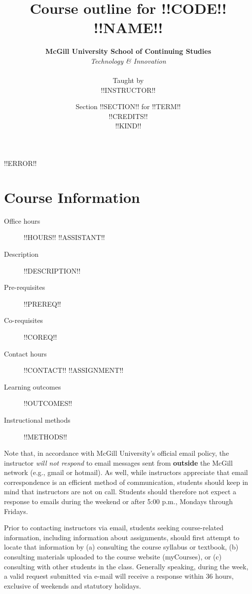 \documentclass{article}
\title{Course outline for !!CODE!! \\ {\sc !!NAME!!}}
\date{Section !!SECTION!! for !!TERM!! \\ !!CREDITS!! \\ !!KIND!!}
\author{{\bf McGill University School of Continuing Studies} \\
  {\em Technology \& Innovation} \\
  \\ Taught by \\ !!INSTRUCTOR!! }
\begin{document}
\maketitle

\thispagestyle{fancy}

!!ERROR!!

\newpage

\tableofcontents
{}

\newpage

\section{Course Information}

\begin{description}
\item[Office hours]{ !!HOURS!!}
!!ASSISTANT!!
\item[Description]{ !!DESCRIPTION!! }
\item[Pre-requisites]{!!PREREQ!!}
\item[Co-requisites]{!!COREQ!!}
\item[Contact hours]{!!CONTACT!!}
!!ASSIGNMENT!!
\item[Learning outcomes]{ !!OUTCOMES!! }
\item[Instructional methods]{ !!METHODS!! }

\end{description}

Note that, in accordance with McGill University’s official email
policy, the instructor {\em will not respond} to email messages sent
from {\bf outside} the McGill network (e.g., gmail or hotmail). As
well, while instructors appreciate that email correspondence is an
efficient method of communication, students should keep in mind that
instructors are not on call. Students should therefore not expect a
response to emails during the weekend or after 5:00 p.m., Mondays
through Fridays.

Prior to contacting instructors via email, students seeking
course-related information, including information about assignments,
should first attempt to locate that information by (a) consulting the
course syllabus or textbook, (b) consulting materials uploaded to the
course website (myCourses), or (c) consulting with other students in
the class. Generally speaking, during the week, a valid request
submitted via e-mail will receive a response within 36 hours,
exclusive of weekends and statutory holidays.

\vfill
\end{document}
